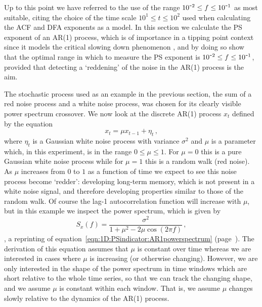 {{Up to this point we have referred to the use of the range $10^{\textup{\texttt{-}}2}\leq f\leq 10^{\textup{\texttt{-}}1}$ as most suitable, citing the choice of the time scale $10^1 \leq t\leq 10^2$ used when calculating the ACF and DFA exponents \citep{livina2007} as a model. In this section we calculate the PS exponent of an AR(1) process, which is of importance in a tipping point context since it models the critical slowing down phenomenon \citep{scheffer2009}, and by doing so show that the optimal range in which to measure the PS exponent is $10^{\textup{\texttt{-}}2}\leq f\leq 10^{\textup{\texttt{-}}1}$, provided that detecting a `reddening' of the noise in the AR(1) process is the aim. 

The stochastic process used as an example in the previous section, the sum of a red noise process and a white noise process, was chosen for its clearly visible power spectrum crossover. We now look at the discrete AR(1) process $x_t$ defined by the equation
	\begin{equation}
		x_t = \mu x_{t-1} + \eta_t\,,
	\end{equation}
where $\eta_t$ is a Gaussian white noise process with variance $\sigma^2$ and $\mu$ is a parameter which, in this experiment, is in the range $0\leq \mu \leq 1$. For $\mu=0$ this is a pure Gaussian white noise process while for $\mu=1$ this is a random walk (red noise). As $\mu$ increases from $0$ to $1$ as a function of time we expect to see this noise process become `redder': developing long-term memory, which is not present in a white noise signal, and therefore developing properties similar to those of the random walk. Of course the lag-1 autocorrelation function will increase with $\mu$, but in this example we inspect the power spectrum, which is given by
	\begin{equation}
	\label{eqn:1D:AR1process_powerspectrum}
		S_x(f) = \frac{\sigma^2}{1+ \mu^2 - 2\mu\cos(2\pi f)}\,,
	\end{equation}
\citep{vonstorch}, a reprinting of equation~\ref{eqn:1D:PSindicator:AR1powerspectrum} (page~\pageref{eqn:1D:PSindicator:AR1powerspectrum}). The derivation of this equation assumes that $\mu$ is constant over time whereas we are interested in cases where $\mu$ is increasing (or otherwise changing). However, we are only interested in the shape of the power spectrum in time windows which are short relative to the whole time series, so that we can track the changing shape, and we assume $\mu$ is constant within each window. That is, we assume $\mu$ changes slowly relative to the dynamics of the AR(1) process. 
 
}}
